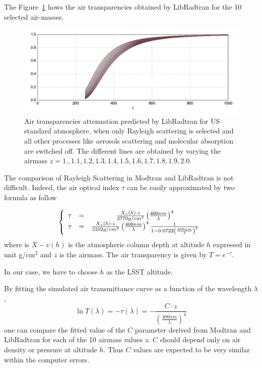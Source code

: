 \documentclass[a4paper]{article}
\begin{document}
The Figure~\ref{fig:rt_rayleigh} hows the air transparencies obtained by LibRadtran for the 10 selected air-masses.
\begin{figure}
\centering
\includegraphics[width=\textwidth]{images/rt_rayleigh}
\caption{\label{fig:rt_rayleigh}Air transparencies attenuation predicted by LibRadtran for US standard atmosphere, when only Rayleigh scattering is selected and all other processes like aerosols scattering and molecular absorption are switched off. The different lines are obtained by varying the airmass $z=1.,1.1,1.2,1.3,1.4,1.5,1.6,1.7,1.8,1.9,2.0$.}
\end{figure}

The comparison of Rayleigh Scattering in Modtran and LibRadtran is not difficult. Indeed, the air optical index $\tau$ can be easily approximated by two formula as follow~\

\begin{equation}
\left\{
\begin{array} {c c c}
\tau& =& \frac{X_v(h)\cdot z}{2770 g/cm^2 } \left( \frac{400 nm}{\lambda}\right)^4 \\
\tau& =& \frac{X_v(h)\cdot z}{3102 g/cm^2 } \left( \frac{400 nm}{\lambda}\right)^4  \frac{1}{ 1-0.0722\left(\frac{400nm}{\lambda}\right)^2} 
\end{array}
\right.
\label{eq:rayleighod}
\end{equation}
where is $X-v(h)$ is the atmospheric column depth at altitude $h$ expressed in unit g/cm$^2$ and $z$ is the airmass.
The air transparency is given by $T=e^{-\tau}$.

In our case, we have to choose $h$ as the LSST altitude.

By fitting the simulated air transmittance curve as a function of the wavelength $\lambda$, 
\begin{equation}
\ln T(\lambda)=-\tau(\lambda)=- \frac{C\cdot z}{\left( \frac{400 nm}{\lambda}\right)^4} 
\end{equation}
one can compare the fitted value of the $C$ parameter derived from Modtran and LibRadtran for each of the 10 airmass values $z$.
$C$ should depend only on air density or pressure at altitude $h$.
Thus $C$ values are expected to be very similar within the computer errors.
\end{document}
